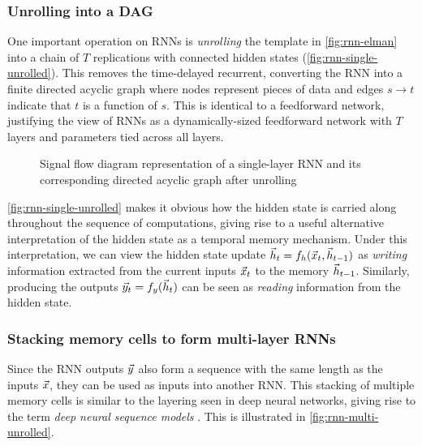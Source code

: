 \documentclass[dissertation.tex]{subfiles}
\begin{document}
\subsubsection{Unrolling into a DAG}

One important operation on RNNs is \emph{unrolling} the template in
\autoref{fig:rnn-elman} into a chain of $T$ replications with connected hidden
states (\autoref{fig:rnn-single-unrolled}). This removes the time-delayed
recurrent, converting the RNN into a finite directed acyclic graph where nodes
represent pieces of data and edges $s \to t$ indicate that $t$ is a function of
$s$. This is identical to a feedforward network, justifying the view of RNNs as
a dynamically-sized feedforward network with $T$ layers and parameters tied
across all layers.


\begin{figure}[htpb]
    \centering
    \resizebox{4.5in}{!}{}
    \caption{Signal flow diagram representation of a single-layer RNN and its corresponding
    directed acyclic graph after unrolling}
    \label{fig:rnn-single-unrolled}
\end{figure}

\autoref{fig:rnn-single-unrolled} makes it obvious how the hidden state is
carried along throughout the sequence of computations, giving rise to a useful
alternative interpretation of the hidden state as a temporal memory mechanism.
Under this interpretation, we can view the hidden state update $\vec{h}_t = f_h
(\vec{x}_t, \vec{h}_{t-1})$ as \emph{writing} information extracted from the
current inputs $\vec{x}_t$ to the memory $\vec{h}_{t-1}$. Similarly, producing
the outputs $\vec{y}_t = f_y (\vec{h}_t)$ can be seen as \emph{reading}
information from the hidden state.


\subsubsection{Stacking memory cells to form multi-layer RNNs}

Since the RNN outputs $\vec{y}$ also form a sequence with the same length as
the inputs $\vec{x}$, they can be used as inputs into another RNN. This
stacking of multiple memory cells is similar to the layering seen in deep
neural networks, giving rise to the term \emph{deep neural sequence models}
. This is illustrated in \autoref{fig:rnn-multi-unrolled}.
\end{document}
